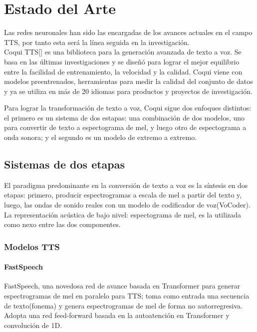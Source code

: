 \chapter{Estado del Arte}\label{chapter:state-of-the-art}

Las redes neuronales han sido las encargadas de los avances actuales en el campo TTS, por tanto esta será la línea seguida en la investigación. \\


Coqui TTS[\cite{coqui-doc}] es una biblioteca para la generación avanzada de texto a voz. Se basa en las últimas investigaciones y se diseñó para lograr el mejor equilibrio entre la facilidad de entrenamiento, la velocidad y la calidad. Coqui viene con modelos preentrenados, herramientas para medir la calidad del conjunto de datos y ya se utiliza en más de 20 idiomas para productos y proyectos de investigación.


Para lograr la transformación de texto a voz, Coqui sigue dos enfoques distintos: el primero es un sistema de dos estapas: una combinación de dos modelos, uno para convertir de texto a espectograma de mel, y luego otro de espectograma a onda sonora; y el segundo es un modelo de extremo a extremo.  

\section{Sistemas de dos etapas}

El paradigma predominante en la conversión de texto a voz es la síntesis en dos etapas: primero, producir espectrogramas a escala de mel a partir del texto y, luego, las ondas de sonido reales con un modelo de codificador de voz(VoCoder). La representación acústica de bajo nivel: espectograma de mel, es la utilizada como nexo entre las dos componentes.


\subsection{Modelos TTS}

\subsubsection{FastSpeech}

FastSpeech, una novedosa red de avance basada en Transformer para generar espectrogramas de mel en paralelo para TTS; toma como entrada una secuencia de texto(fonema) y genera espectrogramas de mel de forma no autorregresiva. Adopta una red feed-forward basada en la autoatención en Transformer y convolución de 1D. 

